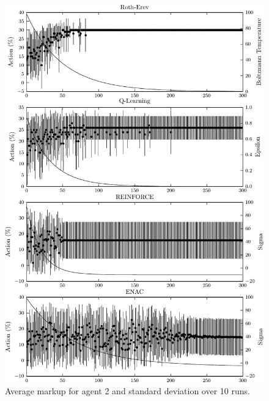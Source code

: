 {	\begin{figure}
	  \centering
	  \includegraphics{figures/fig5_1_action_a2}
	  \caption{Average markup for agent 2 and standard deviation over 10 runs.}
	  \label{fig:5_1_action_a2}
	\end{figure}
}{}

